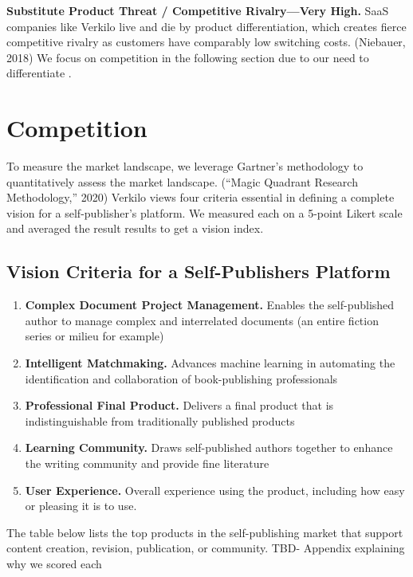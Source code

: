 \documentclass[10pt,openany]{book}
\providecommand{\tightlist}{%
  \setlength{\itemsep}{0pt}\setlength{\parskip}{0pt}}
\begin{document}
\textbf{Substitute Product Threat / Competitive Rivalry---Very High.}
SaaS companies like Verkilo live and die by product differentiation,
which creates fierce competitive rivalry as customers have comparably
low switching costs. (Niebauer, 2018) We focus on competition in the
following section due to our need to differentiate .

\hypertarget{competition}{%
\section{Competition}\label{competition}}

To measure the market landscape, we leverage Gartner's methodology to
quantitatively assess the market landscape. (``Magic Quadrant Research
Methodology,'' 2020) Verkilo views four criteria essential in defining a
complete vision for a self-publisher's platform. We measured each on a
5-point Likert scale and averaged the result results to get a vision
index.

\hypertarget{vision-criteria-for-a-self-publishers-platform}{%
\subsection{Vision Criteria for a Self-Publishers
Platform}\label{vision-criteria-for-a-self-publishers-platform}}

\begin{enumerate}
\def\labelenumi{\arabic{enumi}.}
\tightlist
\item
  \textbf{Complex Document Project Management.} Enables the
  self-published author to manage complex and interrelated documents (an
  entire fiction series or milieu for example)
\item
  \textbf{Intelligent Matchmaking.} Advances machine learning in
  automating the identification and collaboration of book-publishing
  professionals
\item
  \textbf{Professional Final Product.} Delivers a final product that is
  indistinguishable from traditionally published products
\item
  \textbf{Learning Community.} Draws self-published authors together to
  enhance the writing community and provide fine literature
\item
  \textbf{User Experience.} Overall experience using the product,
  including how easy or pleasing it is to use.
\end{enumerate}

The table below lists the top products in the self-publishing market
that support content creation, revision, publication, or community. TBD-
Appendix explaining why we scored each
\end{document}
